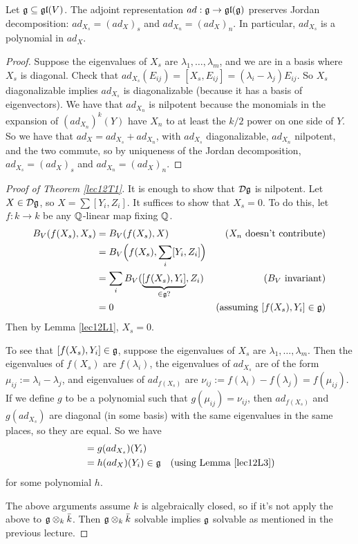 \begin{lemma}\label{lec12L3}
   Let $\mathfrak{g}\subseteq \mathfrak{gl}(V)$. The adjoint representation $ad:\mathfrak{g}\to\mathfrak{gl}(\mathfrak{g})$ preserves
   Jordan decomposition:
   $ad_{X_s}=(ad_X)_s$ and $ad_{X_n} = (ad_X)_n$. In particular, $ad_{X_s}$ is a
   polynomial in $ad_{X}$.
 \end{lemma}
 \begin{proof}
   Suppose the eigenvalues of $X_s$ are $\lambda_1,\dots, \lambda_m$, and we are in a
   basis where $X_s$ is diagonal. Check that
   $ad_{X_s}(E_{ij})=[X_s,E_{ij}]=(\lambda_i-\lambda_j)E_{ij}$. So $X_s$
   diagonalizable implies $ad_{X_s}$ is diagonalizable (because it has a basis of
   eigenvectors). We have that $ad_{X_n}$ is nilpotent because the monomials in the
   expansion of $(ad_{X_n})^k(Y)$ have $X_n$ to at least the $k/2$ power on one side
   of $Y$. So we have that $ad_X = ad_{X_s}+ad_{X_n}$, with $ad_{X_s}$ diagonalizable,
   $ad_{X_n}$ nilpotent, and the two commute, so by uniqueness of the Jordan
   decomposition, $ad_{X_s}=(ad_X)_s$ and $ad_{X_n}=(ad_X)_n$.
 \end{proof}

 \begin{proof}[Proof of Theorem \ref{lec12T1}]
   It is enough to show that $\mathcal{D}\mathfrak{g}$ is nilpotent. Let
   $X\in \mathcal{D}\mathfrak{g}$, so $X=\sum [Y_i,Z_i]$. It suffices to show that $X_s = 0$.  To do
   this, let $f:k \rightarrow k$ be any $\mathbb{Q}$-linear map fixing $\mathbb{Q}$.
   \begin{align*}
     B_V(f(X_s),X_s) &= B_V(f(X_s), X) & \text{($X_n$ doesn't contribute)}\\
     &= B_V{\Big (}f(X_s), \sum_i [Y_i,Z_i]{ \Big )} \\
     &= \sum_i B_V(\underbrace{[f(X_s),Y_i]}_{\in \mathfrak{g} ?},Z_i) & \text{($B_V$ invariant)}\\
     &= 0 & (\text{assuming } [f(X_s),Y_i]\in \mathfrak{g})
   \end{align*}
   Then by Lemma \ref{lec12L1}, $X_s=0$.

   To see that $[f(X_s),Y_i]\in \mathfrak{g}$, suppose the eigenvalues of $X_s$ are
   $\lambda_1,\dots, \lambda_m$.  Then the eigenvalues of $f(X_s)$ are $f(\lambda_i)$,
   the eigenvalues of $ad_{X_s}$ are of the form $\mu_{ij} := \lambda_i - \lambda_j$,
   and eigenvalues of $ad_{f(X_s)}$ are $\nu_{ij} := f(\lambda_i) - f(\lambda_j) =
   f(\mu_{ij})$.  If we define $g$ to be a polynomial such that $g(\mu_{ij}) =
   \nu_{ij}$, then $ad_{f(X_s)}$ and $g(ad_{X_s})$ are diagonal (in some basis) with
   the same eigenvalues in the same places, so they are equal. So we have
   \begin{align*}
   [f(X_s),Y_i] &= g(ad_{X_s})(Y_i) \\
    &= h(ad_X)(Y_i) \in \g & \text{(using Lemma \ref{lec12L3})}
   \end{align*}
   for some polynomial $h$.

   The above arguments assume $k$ is algebraically closed, so if it's not apply the
   above to $\mathfrak{g}\otimes_k \bar k$.  Then $\mathfrak{g}\otimes_k \bar k$ solvable implies $\mathfrak{g}$
   solvable as mentioned in the previous lecture.
 \end{proof}

